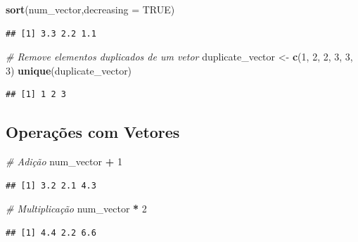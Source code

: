 \documentclass[
]{book}
\newenvironment{Shaded}{\begin{snugshade}}{\end{snugshade}}
\newcommand{\AttributeTok}[1]{\textcolor[rgb]{0.13,0.29,0.53}{#1}}
\newcommand{\CommentTok}[1]{\textcolor[rgb]{0.56,0.35,0.01}{\textit{#1}}}
\newcommand{\ConstantTok}[1]{\textcolor[rgb]{0.56,0.35,0.01}{#1}}
\newcommand{\DecValTok}[1]{\textcolor[rgb]{0.00,0.00,0.81}{#1}}
\newcommand{\FunctionTok}[1]{\textcolor[rgb]{0.13,0.29,0.53}{\textbf{#1}}}
\newcommand{\NormalTok}[1]{#1}
\newcommand{\OtherTok}[1]{\textcolor[rgb]{0.56,0.35,0.01}{#1}}
\newcommand{\SpecialCharTok}[1]{\textcolor[rgb]{0.81,0.36,0.00}{\textbf{#1}}}
\theoremstyle{definition}
\theoremstyle{definition}
\theoremstyle{definition}
\theoremstyle{definition}
\theoremstyle{remark}
\begin{document}
\begin{Shaded}
\begin{Highlighting}[]
\FunctionTok{sort}\NormalTok{(num\_vector,}\AttributeTok{decreasing =} \ConstantTok{TRUE}\NormalTok{)}
\end{Highlighting}
\end{Shaded}

\begin{verbatim}
## [1] 3.3 2.2 1.1
\end{verbatim}

\begin{Shaded}
\begin{Highlighting}[]
\CommentTok{\# Remove elementos duplicados de um vetor}
\NormalTok{duplicate\_vector }\OtherTok{\textless{}{-}} \FunctionTok{c}\NormalTok{(}\DecValTok{1}\NormalTok{, }\DecValTok{2}\NormalTok{, }\DecValTok{2}\NormalTok{, }\DecValTok{3}\NormalTok{, }\DecValTok{3}\NormalTok{, }\DecValTok{3}\NormalTok{)}
\FunctionTok{unique}\NormalTok{(duplicate\_vector)  }
\end{Highlighting}
\end{Shaded}

\begin{verbatim}
## [1] 1 2 3
\end{verbatim}

\subsection{Operações com Vetores}\label{operauxe7uxf5es-com-vetores}

\begin{Shaded}
\begin{Highlighting}[]
\CommentTok{\# Adição}
\NormalTok{num\_vector }\SpecialCharTok{+} \DecValTok{1}  
\end{Highlighting}
\end{Shaded}

\begin{verbatim}
## [1] 3.2 2.1 4.3
\end{verbatim}

\begin{Shaded}
\begin{Highlighting}[]
\CommentTok{\# Multiplicação}
\NormalTok{num\_vector }\SpecialCharTok{*} \DecValTok{2}  
\end{Highlighting}
\end{Shaded}

\begin{verbatim}
## [1] 4.4 2.2 6.6
\end{verbatim}
\end{document}
